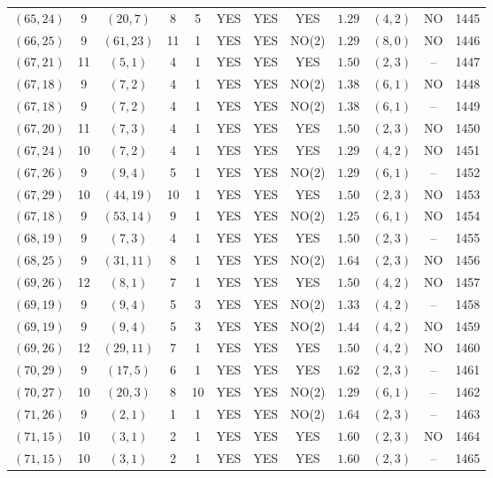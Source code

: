 \begin{longtable}{|c|c|c|c|c|c|c|c|c|c|c|c|}
$(65,24)$ & 9 & $(20,7)$ & 8 & 5 & YES & YES & YES & $1.29$ & $(4,2)$ & NO & 1445\\
$(66,25)$ & 9 & $(61,23)$ & 11 & 1 & YES & YES & NO(2) & $1.29$ & $(8,0)$ & NO & 1446\\
$(67,21)$ & 11 & $(5,1)$ & 4 & 1 & YES & YES & YES & $1.50$ & $(2,3)$ & -- & 1447\\
$(67,18)$ & 9 & $(7,2)$ & 4 & 1 & YES & YES & NO(2) & $1.38$ & $(6,1)$ & NO & 1448\\
$(67,18)$ & 9 & $(7,2)$ & 4 & 1 & YES & YES & NO(2) & $1.38$ & $(6,1)$ & -- & 1449\\
$(67,20)$ & 11 & $(7,3)$ & 4 & 1 & YES & YES & YES & $1.50$ & $(2,3)$ & NO & 1450\\
$(67,24)$ & 10 & $(7,2)$ & 4 & 1 & YES & YES & YES & $1.29$ & $(4,2)$ & NO & 1451\\
$(67,26)$ & 9 & $(9,4)$ & 5 & 1 & YES & YES & NO(2) & $1.29$ & $(6,1)$ & -- & 1452\\
$(67,29)$ & 10 & $(44,19)$ & 10 & 1 & YES & YES & YES & $1.50$ & $(2,3)$ & NO & 1453\\
$(67,18)$ & 9 & $(53,14)$ & 9 & 1 & YES & YES & NO(2) & $1.25$ & $(6,1)$ & NO & 1454\\
$(68,19)$ & 9 & $(7,3)$ & 4 & 1 & YES & YES & YES & $1.50$ & $(2,3)$ & -- & 1455\\
$(68,25)$ & 9 & $(31,11)$ & 8 & 1 & YES & YES & NO(2) & $1.64$ & $(2,3)$ & NO & 1456\\
$(69,26)$ & 12 & $(8,1)$ & 7 & 1 & YES & YES & YES & $1.50$ & $(4,2)$ & NO & 1457\\
$(69,19)$ & 9 & $(9,4)$ & 5 & 3 & YES & YES & NO(2) & $1.33$ & $(4,2)$ & -- & 1458\\
$(69,19)$ & 9 & $(9,4)$ & 5 & 3 & YES & YES & NO(2) & $1.44$ & $(4,2)$ & NO & 1459\\
$(69,26)$ & 12 & $(29,11)$ & 7 & 1 & YES & YES & YES & $1.50$ & $(4,2)$ & NO & 1460\\
$(70,29)$ & 9 & $(17,5)$ & 6 & 1 & YES & YES & YES & $1.62$ & $(2,3)$ & -- & 1461\\
$(70,27)$ & 10 & $(20,3)$ & 8 & 10 & YES & YES & NO(2) & $1.29$ & $(6,1)$ & -- & 1462\\
$(71,26)$ & 9 & $(2,1)$ & 1 & 1 & YES & YES & NO(2) & $1.64$ & $(2,3)$ & -- & 1463\\
$(71,15)$ & 10 & $(3,1)$ & 2 & 1 & YES & YES & YES & $1.60$ & $(2,3)$ & NO & 1464\\
$(71,15)$ & 10 & $(3,1)$ & 2 & 1 & YES & YES & YES & $1.60$ & $(2,3)$ & -- & 1465\\

\end{longtable}
